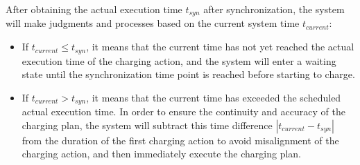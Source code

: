 \documentclass[
	english,
	ruledheaders=section,%
	class=report,%
	thesis={type=Report},%
	accentcolor=9c,%
	custommargins=true,%
	marginpar=false,%
	parskip=half-,%
	fontsize=11pt,%
	logofile={img/tuda_logo.pdf}, %
]{tudapub}
\begin{document}


After obtaining the actual execution time $t_{syn}$ after synchronization, the system will make judgments and processes based on the current system time $t_{current}$:
\begin{itemize}
    \item If $t_{current} \leq t_{syn}$, it means that the current time has not yet reached the actual execution time of the charging action, and the system will enter a waiting state until the synchronization time point is reached before starting to charge.
    \item If $t_{current} > t_{syn}$, it means that the current time has exceeded the scheduled actual execution time. In order to ensure the continuity and accuracy of the charging plan, the system will subtract this time difference $|t_{current} - t_{syn}|$ from the duration of the first charging action to avoid misalignment of the charging action, and then immediately execute the charging plan.
\end{itemize}


\end{document}
